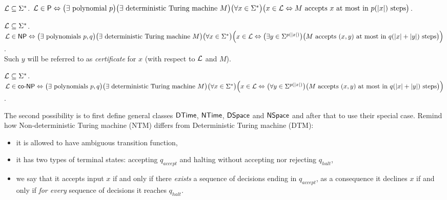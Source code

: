 		\begin{defn}\label{def:P}
			${\cal L} \subseteq \Sigma^*$. ${\cal L} \in \P \iff \bigl(\exists \textnormal{ polynomial } p \bigr) \bigl(\exists \textnormal{ deterministic Turing machine } M\bigr)\\ \bigl(\forall x \in \Sigma^*\bigr) \bigl(x \in {\cal L} \iff M \textnormal{ accepts } x \textnormal{ at most in } p(|x|) \textnormal{ steps} \bigr)$.
		\end{defn}
		
		\begin{defn}\label{def:NP}
			${\cal L} \subseteq \Sigma^*$. ${\cal L} \in \NP \iff \bigl(\exists \textnormal{ polynomials } p, q \bigr) \bigl(\exists \textnormal{ deterministic Turing machine } M\bigr)\\ \bigl(\forall x \in \Sigma^*\bigr) \Bigl(x \in {\cal L} \iff \bigl(\exists y \in \Sigma^{p(|x|)}\bigr) \bigl(M \textnormal{ accepts } (x,y) \textnormal{ at most in } q(|x|+|y|) \textnormal{ steps} \bigr)\Bigr)$.\\
			Such $y$ will be referred to as {\em certificate} for $x$ (with respect to $\cal L$ and $M$).
		\end{defn}
		
		\begin{defn}\label{def:coNP}
			${\cal L} \subseteq \Sigma^*$. ${\cal L} \in \coNP \iff \bigl(\exists \textnormal{ polynomials } p, q \bigr) \bigl(\exists \textnormal{ deterministic Turing machine } M\bigr)\\ \bigl(\forall x \in \Sigma^*\bigr) \Bigl(x \in {\cal L} \iff \bigl(\forall y \in \Sigma^{p(|x|)}\bigr) \bigl(M \textnormal{ accepts } (x,y) \textnormal{ at most in } q(|x|+|y|) \textnormal{ steps} \bigr)\Bigr)$.
		\end{defn}
		
		The second possibility is to first define general classes $\DTime$, $\NTime$, $\DSpace$ and $\NSpace$ and after that to use their special case. Remind how Non-deterministic Turing machine (NTM) differs from Deterministic Turing machine (DTM):
		\begin{itemize}
			\item it is allowed to have ambiguous transition function,
			\item it has two types of terminal states: accepting $q_{accept}$ and halting without accepting nor rejecting $q_{halt}$,
			\item we say that it accepts input $x$ if and only if there {\em exists} a sequence of decisions ending in $q_{accept}$, as a consequence it declines $x$ if and only if {\em for every} sequence of decisions it reaches $q_{halt}$.
		\end{itemize}
		
